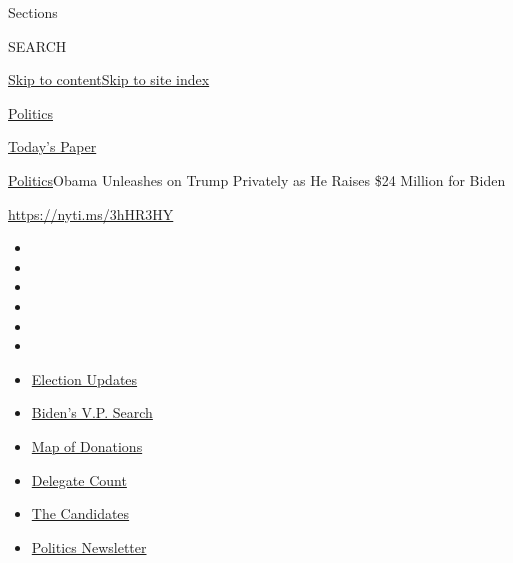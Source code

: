 Sections

SEARCH

\protect\hyperlink{site-content}{Skip to
content}\protect\hyperlink{site-index}{Skip to site index}

\href{https://www.nytimes.com/section/politics}{Politics}

\href{https://myaccount.nytimes.com/auth/login?response_type=cookie\&client_id=vi}{}

\href{https://www.nytimes.com/section/todayspaper}{Today's Paper}

\href{/section/politics}{Politics}\textbar{}Obama Unleashes on Trump
Privately as He Raises \$24 Million for Biden

\url{https://nyti.ms/3hHR3HY}

\begin{itemize}
\item
\item
\item
\item
\item
\item
\end{itemize}

\begin{itemize}
\item
  \href{https://www.nytimes.com/2020/07/31/us/elections/biden-vs-trump.html?action=click\&pgtype=Article\&state=default\&region=TOP_BANNER\&context=storylines_menu}{Election
  Updates}
\item
  \href{https://www.nytimes.com/article/biden-vice-president-2020.html?action=click\&pgtype=Article\&state=default\&region=TOP_BANNER\&context=storylines_menu}{Biden's
  V.P. Search}
\item
  \href{https://www.nytimes.com/interactive/2020/07/24/us/politics/trump-biden-campaign-donors.html?action=click\&pgtype=Article\&state=default\&region=TOP_BANNER\&context=storylines_menu}{Map
  of Donations}
\item
  \href{https://www.nytimes.com/interactive/2020/us/elections/delegate-count-primary-results.html?action=click\&pgtype=Article\&state=default\&region=TOP_BANNER\&context=storylines_menu}{Delegate
  Count}
\item
  \href{https://www.nytimes.com/interactive/2019/us/politics/2020-presidential-candidates.html?action=click\&pgtype=Article\&state=default\&region=TOP_BANNER\&context=storylines_menu}{The
  Candidates}
\item
  \href{https://www.nytimes.com/newsletters/politics?action=click\&pgtype=Article\&state=default\&region=TOP_BANNER\&context=storylines_menu}{Politics
  Newsletter}
\end{itemize}

